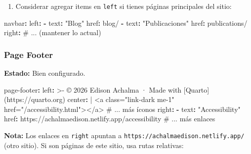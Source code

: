 \documentclass[
  doc,
  floatsintext,
  longtable,
  a4paper,
  nolmodern,
  notxfonts,
  notimes,
  12pt,
  colorlinks=true,linkcolor=blue,citecolor=blue,urlcolor=blue]{apa7}
\newenvironment{Shaded}{\begin{snugshade}}{\end{snugshade}}
\newcommand{\AttributeTok}[1]{\textcolor[rgb]{0.40,0.45,0.13}{#1}}
\newcommand{\CharTok}[1]{\textcolor[rgb]{0.13,0.47,0.30}{#1}}
\newcommand{\CommentTok}[1]{\textcolor[rgb]{0.37,0.37,0.37}{#1}}
\newcommand{\FunctionTok}[1]{\textcolor[rgb]{0.28,0.35,0.67}{#1}}
\newcommand{\KeywordTok}[1]{\textcolor[rgb]{0.00,0.23,0.31}{\textbf{#1}}}
\newcommand{\NormalTok}[1]{\textcolor[rgb]{0.00,0.23,0.31}{#1}}
\newcommand{\StringTok}[1]{\textcolor[rgb]{0.13,0.47,0.30}{#1}}
\providecommand{\tightlist}{%
  \setlength{\itemsep}{0pt}\setlength{\parskip}{0pt}}
\begin{document}
\begin{enumerate}
\def\labelenumi{\arabic{enumi}.}
\setcounter{enumi}{1}
\tightlist
\item
  Considerar agregar items en \texttt{left} si tienes páginas
  principales del sitio:
\end{enumerate}

\begin{Shaded}
\begin{Highlighting}[]
\FunctionTok{navbar}\KeywordTok{:}
\AttributeTok{  }\FunctionTok{left}\KeywordTok{:}
\AttributeTok{    }\KeywordTok{{-}}\AttributeTok{ }\FunctionTok{text}\KeywordTok{:}\AttributeTok{ }\StringTok{"Blog"}
\AttributeTok{      }\FunctionTok{href}\KeywordTok{:}\AttributeTok{ blog/}
\AttributeTok{    }\KeywordTok{{-}}\AttributeTok{ }\FunctionTok{text}\KeywordTok{:}\AttributeTok{ }\StringTok{"Publicaciones"}
\AttributeTok{      }\FunctionTok{href}\KeywordTok{:}\AttributeTok{ publications/}
\AttributeTok{  }\FunctionTok{right}\KeywordTok{:}
\CommentTok{    \# ... (mantener lo actual)}
\end{Highlighting}
\end{Shaded}

\subsubsection{Page Footer}\label{page-footer-1}

\textbf{Estado:} Bien configurado.

\begin{Shaded}
\begin{Highlighting}[]
\FunctionTok{page{-}footer}\KeywordTok{:}
\FunctionTok{  left}\KeywordTok{: }\CharTok{\textgreater{}{-}}
\NormalTok{    © 2026 Edison Achalma · Made with [Quarto](https://quarto.org)}
\FunctionTok{  center}\KeywordTok{: }\CharTok{|}
\NormalTok{    \textless{}a class="link{-}dark me{-}1" href="/accessibility.html"\textgreater{}\textless{}/a\textgreater{}}
\NormalTok{    \# ... más íconos}
\AttributeTok{  }\FunctionTok{right}\KeywordTok{:}
\AttributeTok{    }\KeywordTok{{-}}\AttributeTok{ }\FunctionTok{text}\KeywordTok{:}\AttributeTok{ }\StringTok{"Accessibility"}
\AttributeTok{      }\FunctionTok{href}\KeywordTok{:}\AttributeTok{ https://achalmaedison.netlify.app/accessibility}
\CommentTok{    \# ... más enlaces}
\end{Highlighting}
\end{Shaded}

\textbf{Nota:} Los enlaces en \texttt{right} apuntan a
\texttt{https://achalmaedison.netlify.app/} (otro sitio). Si son páginas
de este sitio, usa rutas relativas:
\end{document}
